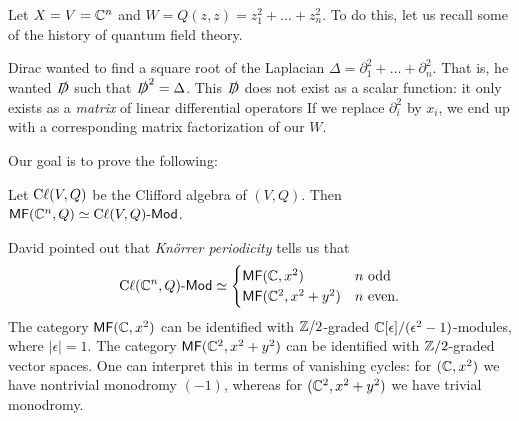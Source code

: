 \documentclass{article}
\begin{document}
Let $X = V = \mathbb{C}^n$ and $W = Q(z, z) = z_1^2 + \dots + z_n^2$.
To do this, let us recall some of the history of quantum field theory.

Dirac wanted to find a square root of the Laplacian $\Delta = \partial_1^2 + \dots + \partial_n^2$.
That is, he wanted $\slashed{D}$ such that $\slashed{D}^2 = \Delta$.
This $\slashed{D}$ does not exist as a scalar function: it only exists as a \emph{matrix} of linear differential operators
If we replace $\partial_i^2$ by $x_i$, we end up with a corresponding matrix factorization of our $W$.

Our goal is to prove the following:

\begin{thm}
	Let $\operatorname{C\ell}(V, Q)$ be the Clifford algebra of $(V, Q)$.
	Then $\mathsf{MF}(\mathbb{C}^n, Q) \simeq \operatorname{C\ell}(V, Q)\text{-}\mathsf{Mod}$.
\end{thm}

David pointed out that \emph{Kn\"orrer periodicity} tells us that
\[
	\operatorname{C\ell}(\mathbb{C}^n, Q)\text{-}\mathsf{Mod} \simeq \begin{cases}
		\mathsf{MF}(\mathbb{C}, x^2) & n \textrm{ odd} \\
		\mathsf{MF}(\mathbb{C}^2, x^2 + y^2) & n \textrm{ even}.
	\end{cases}
\]
The category $\mathsf{MF}(\mathbb{C}, x^2)$ can be identified with $\mathbb{Z}/2$-graded $\mathbb{C}[\epsilon] / (\epsilon^2 - 1)$-modules, where $|\epsilon| = 1$.
The category $\mathsf{MF}(\mathbb{C}^2, x^2 + y^2)$ can be identified with $\mathbb{Z}/2$-graded vector spaces.
One can interpret this in terms of vanishing cycles: for $(\mathbb{C}, x^2)$ we have nontrivial monodromy $(-1)$, whereas for $(\mathbb{C}^2, x^2 + y^2)$ we have trivial monodromy.
\end{document}
